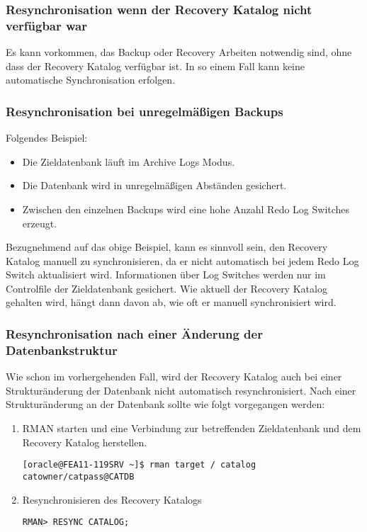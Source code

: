         \subsubsection{Resynchronisation wenn der Recovery Katalog nicht verf\"ugbar war}
          Es kann vorkommen, das Backup oder Recovery Arbeiten notwendig sind, ohne dass der Recovery Katalog verf\"ugbar ist. In so einem Fall kann keine automatische Synchronisation erfolgen.
        \subsubsection{Resynchronisation bei unregelm\"a\ss{}igen Backups}
          Folgendes Beispiel:
          \begin{itemize}
            \item Die Zieldatenbank l\"auft im Archive Logs Modus.
            \item Die Datenbank wird in unregelm\"a\ss{}igen Abst\"anden gesichert.
            \item Zwischen den einzelnen Backups wird eine hohe Anzahl Redo Log Switches erzeugt.
          \end{itemize}
          Bezugnehmend auf das obige Beispiel, kann es sinnvoll sein, den Recovery Katalog manuell zu synchronisieren, da er nicht automatisch bei jedem Redo Log Switch aktualisiert wird. Informationen \"uber Log Switches werden nur im Controlfile der Zieldatenbank gesichert. Wie aktuell der Recovery Katalog gehalten wird, h\"angt dann davon ab, wie oft er manuell synchronisiert wird.
        \subsubsection{Resynchronisation nach einer \"Anderung der Datenbankstruktur}
          Wie schon im vorhergehenden Fall, wird der Recovery Katalog auch bei
          einer Struk\-tur\-\"an\-der\-ung der Datenbank nicht automatisch
          resynchronisiert. Nach einer Struktur\"anderung an der Datenbank
          sollte wie folgt vorgegangen werden:
\clearpage
          \begin{enumerate}
            \item RMAN starten und eine Verbindung zur betreffenden Zieldatenbank und dem Recovery Katalog herstellen.
              \begin{lstlisting}[caption={Starten des RMAN},label=admin1215,language=rman]
[oracle@FEA11-119SRV ~]$ rman target / catalog catowner/catpass@CATDB
              \end{lstlisting}
            \item Resynchronisieren des Recovery Katalogs
              \begin{lstlisting}[caption={Resynchronisieren des Recovery Katalogs},label=admin1216,language=rman]
RMAN> RESYNC CATALOG;
              \end{lstlisting}
          \end{enumerate}
